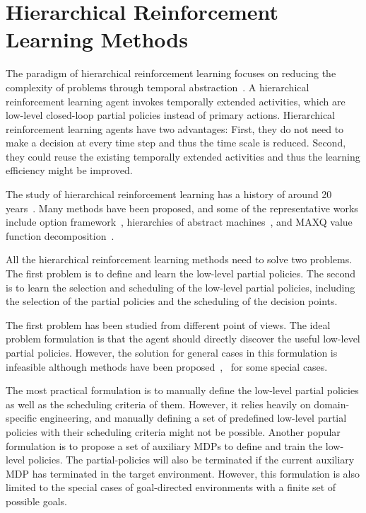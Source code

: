 \section{Hierarchical Reinforcement Learning Methods}

The paradigm of hierarchical reinforcement learning focuses on reducing the complexity of problems through temporal abstraction~\cite{barto2003recent}. A hierarchical reinforcement learning agent invokes temporally extended activities, which are low-level closed-loop partial policies instead of primary actions. Hierarchical reinforcement learning agents have two advantages: First, they do not need to make a decision at every time step and thus the time scale is reduced. Second, they could reuse the existing temporally extended activities and thus the learning efficiency might be improved.

The study of hierarchical reinforcement learning has a history of around 20 years~\cite{sutton1999between}. Many methods have been proposed,  and some of the representative works include option framework~\cite{sutton1999between}, hierarchies of abstract machines~\cite{parr1998reinforcement}, and MAXQ value function decomposition~\cite{dietterich2000hierarchical}.

All the hierarchical reinforcement learning methods need to solve two problems. The first problem is to define and learn the low-level partial policies. The second is to learn the selection and scheduling of the low-level partial policies, including the selection of the partial policies and the scheduling of the decision points.

The first problem has been studied from different point of views. The ideal problem formulation is that the agent should directly discover the useful low-level partial policies. However, the solution for general cases in this formulation is infeasible although methods have been proposed~\cite{mcgovern2001automatic},~\cite{hengst2002discovering} for some special cases. 

The most practical formulation is to manually define the low-level partial policies as well as the scheduling criteria of them. However, it relies heavily on domain-specific engineering, and manually defining a set of predefined low-level partial policies with their scheduling criteria might not be possible. Another popular formulation is to propose a set of auxiliary MDPs to define and train the low-level policies. The partial-policies will also be terminated if the current auxiliary MDP has terminated in the target environment. However, this formulation is also limited to the special cases of goal-directed environments with a finite set of possible goals. 

